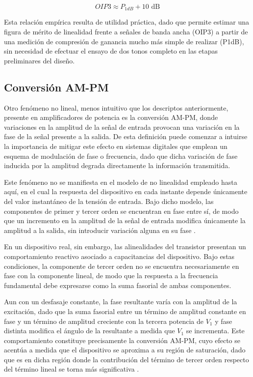 \begin{equation}
    OIP3 \approx P_{1dB} + 10 \text{ dB}
    \label{eq:oip3_p1db}
\end{equation}

Esta relación empírica resulta de utilidad práctica, dado que permite estimar una figura de mérito de linealidad frente a señales de banda ancha (OIP3) a partir de una medición de compresión de ganancia mucho más simple de realizar (P1dB), sin necesidad de efectuar el ensayo de dos tonos completo en las etapas preliminares del diseño.

\subsection{Conversión AM-PM}
Otro fenómeno no lineal, menos intuitivo que los descriptos anteriormente, presente en amplificadores de potencia es la conversión AM-PM, donde variaciones en la amplitud de la señal de entrada provocan una variación en la fase de la señal presente a la salida. De esta definición puede comenzar a intuirse la importancia de mitigar este efecto en sistemas digitales que emplean un esquema de modulación de fase o frecuencia, dado que dicha variación de fase inducida por la amplitud degrada directamente la información transmitida.

Este fenómeno no se manifiesta en el modelo de no linealidad empleado hasta aquí, en el cual la respuesta del dispositivo en cada instante depende únicamente del valor instantáneo de la tensión de entrada. Bajo dicho modelo, las componentes de primer y tercer orden se encuentran en fase entre sí, de modo que un incremento en la amplitud de la señal de entrada modifica únicamente la amplitud a la salida, sin introducir variación alguna en su fase \cite[pp.15--16]{maas2003}.

En un dispositivo real, sin embargo, las alinealidades del transistor presentan un comportamiento reactivo asociado a capacitancias del dispositivo. Bajo estas condiciones, la componente de tercer orden no se encuentra necesariamente en fase con la componente lineal, de modo que la respuesta a la frecuencia fundamental debe expresarse como la suma fasorial de ambas componentes.

Aun con un desfasaje constante, la fase resultante varía con la amplitud de la excitación, dado que la suma fasorial entre un término de amplitud constante en fase y un término de amplitud creciente con la tercera potencia de $V_1$ y fase distinta modifica el ángulo de la resultante a medida que $V_1$ se incrementa. Este comportamiento constituye precisamente la conversión AM-PM, cuyo efecto se acentúa a medida que el dispositivo se aproxima a su región de saturación, dado que es en dicha región donde la contribución del término de tercer orden respecto del término lineal se torna más significativa .

